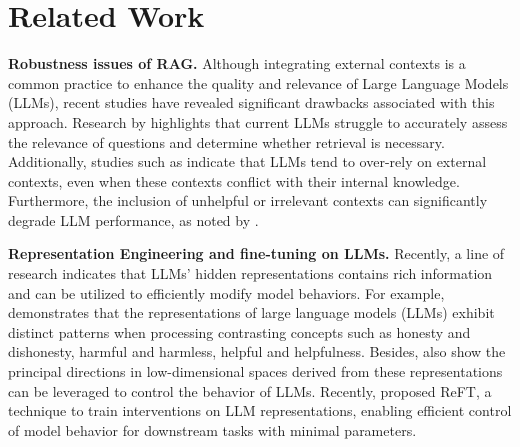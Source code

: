 \section{Related Work}
\label{Intro}

{\bf Robustness issues of RAG.} Although integrating external contexts is a common practice to enhance the quality and relevance of Large Language Models (LLMs), recent studies have revealed significant drawbacks associated with this approach. Research by \citet{ren2023investigating,wang2023resolving,ni-etal-2024-llms,liu2024ra,wang2023self,asaiself} highlights that current LLMs struggle to accurately assess the relevance of questions and determine whether retrieval is necessary. Additionally, studies such as \cite{zeng2024good, zou2024poisonedrag, dengpandora, xieadaptive} indicate that LLMs tend to over-rely on external contexts, even when these contexts conflict with their internal knowledge. Furthermore, the inclusion of unhelpful or irrelevant contexts can significantly degrade LLM performance, as noted by \cite{yoranmaking,fang-etal-2024-enhancing,chen2024benchmarking,sawarkar2024blended,wang2024astute,zeng2024towards,liu2024ra,zhao2024retrieval}. %



{\bf Representation Engineering and fine-tuning on LLMs.}
 Recently, a line of research indicates that LLMs' hidden representations contains rich information and can be utilized to efficiently modify model behaviors. For example, \cite{zou2023representation,zeng2024towards,lin2024towards,zheng2024prompt} demonstrates that the representations of large language models (LLMs) exhibit distinct patterns when processing contrasting concepts such as honesty and dishonesty, harmful and harmless, helpful and helpfulness.
 Besides, \citet{zou2023representation} also show the principal directions in low-dimensional spaces derived from these representations can be leveraged to control the behavior of LLMs.  Recently, \citet{wu2024reft} proposed ReFT, a technique to train interventions on LLM representations, enabling efficient control of model behavior for downstream tasks with minimal parameters.%
 
